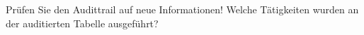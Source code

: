     \item Prüfen Sie den Audittrail auf neue Informationen! Welche Tätigkeiten wurden an der auditierten Tabelle ausgeführt?
